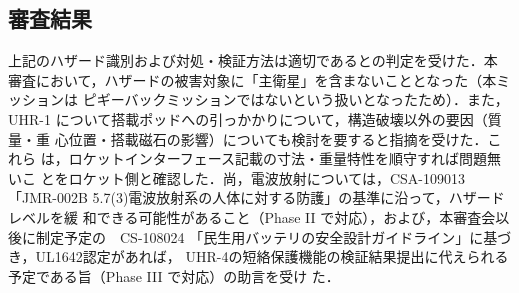 \subsection{審査結果}
上記のハザード識別および対処・検証方法は適切であるとの判定を受けた．本
審査において，ハザードの被害対象に「主衛星」を含まないこととなった（本ミッションは
  ピギーバックミッションではないという扱いとなったため）．また，UHR-1
について搭載ポッドへの引っかかりについて，構造破壊以外の要因（質量・重
  心位置・搭載磁石の影響）についても検討を要すると指摘を受けた．これら
は，ロケットインターフェース記載の寸法・重量特性を順守すれば問題無いこ
とをロケット側と確認した．尚，電波放射については，CSA-109013「JMR-002B
5.7(3)電波放射系の人体に対する防護」の基準に沿って，ハザードレベルを緩
和できる可能性があること（Phase II で対応），および，本審査会以後に制定予定の　CS-108024
「民生用バッテリの安全設計ガイドライン」に基づき，UL1642認定があれば，
UHR-4の短絡保護機能の検証結果提出に代えられる予定である旨（Phase III
  で対応）の助言を受け
た．
